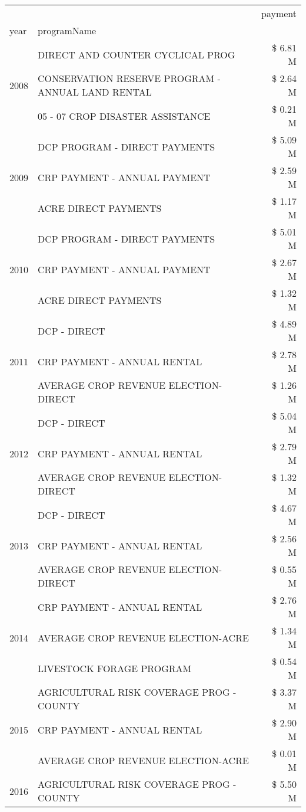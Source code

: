 \begin{tabular}{llr}
\toprule
 &  & payment \\
year & programName &  \\
\midrule
\multirow[t]{3}{*}{2008} & DIRECT AND COUNTER CYCLICAL PROG & \$ 6.81 M \\
 & CONSERVATION RESERVE PROGRAM - ANNUAL LAND RENTAL & \$ 2.64 M \\
 & 05 - 07 CROP DISASTER ASSISTANCE & \$ 0.21 M \\
\cline{1-3}
\multirow[t]{3}{*}{2009} & DCP PROGRAM - DIRECT PAYMENTS & \$ 5.09 M \\
 & CRP PAYMENT - ANNUAL PAYMENT & \$ 2.59 M \\
 & ACRE DIRECT PAYMENTS & \$ 1.17 M \\
\cline{1-3}
\multirow[t]{3}{*}{2010} & DCP PROGRAM - DIRECT PAYMENTS & \$ 5.01 M \\
 & CRP PAYMENT - ANNUAL PAYMENT & \$ 2.67 M \\
 & ACRE DIRECT PAYMENTS & \$ 1.32 M \\
\cline{1-3}
\multirow[t]{3}{*}{2011} & DCP - DIRECT & \$ 4.89 M \\
 & CRP PAYMENT - ANNUAL RENTAL & \$ 2.78 M \\
 & AVERAGE CROP REVENUE ELECTION-DIRECT & \$ 1.26 M \\
\cline{1-3}
\multirow[t]{3}{*}{2012} & DCP - DIRECT & \$ 5.04 M \\
 & CRP PAYMENT - ANNUAL RENTAL & \$ 2.79 M \\
 & AVERAGE CROP REVENUE ELECTION-DIRECT & \$ 1.32 M \\
\cline{1-3}
\multirow[t]{3}{*}{2013} & DCP - DIRECT & \$ 4.67 M \\
 & CRP PAYMENT - ANNUAL RENTAL & \$ 2.56 M \\
 & AVERAGE CROP REVENUE ELECTION-DIRECT & \$ 0.55 M \\
\cline{1-3}
\multirow[t]{3}{*}{2014} & CRP PAYMENT - ANNUAL RENTAL & \$ 2.76 M \\
 & AVERAGE CROP REVENUE ELECTION-ACRE & \$ 1.34 M \\
 & LIVESTOCK FORAGE PROGRAM & \$ 0.54 M \\
\cline{1-3}
\multirow[t]{3}{*}{2015} & AGRICULTURAL RISK COVERAGE PROG - COUNTY & \$ 3.37 M \\
 & CRP PAYMENT - ANNUAL RENTAL & \$ 2.90 M \\
 & AVERAGE CROP REVENUE ELECTION-ACRE & \$ 0.01 M \\
\cline{1-3}
\multirow[t]{3}{*}{2016} & AGRICULTURAL RISK COVERAGE PROG - COUNTY & \$ 5.50 M \\

\end{tabular}
